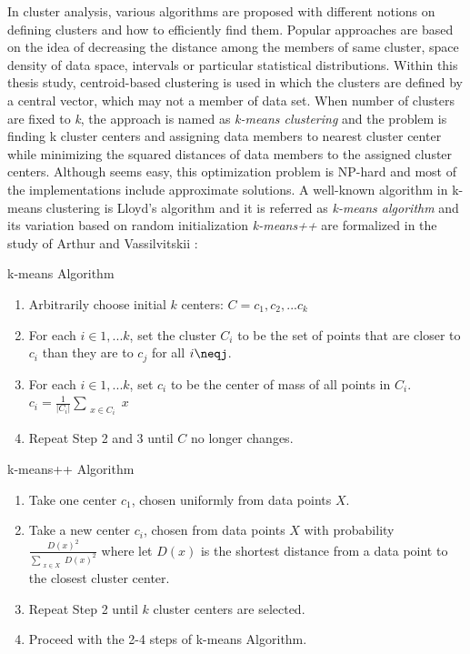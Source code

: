 In cluster analysis, various algorithms are proposed with different notions on defining clusters and how to efficiently find them. Popular approaches are based on the idea of decreasing the distance among the members of same cluster, space density of data space, intervals or particular statistical distributions. Within this thesis study, centroid-based clustering is used in which the clusters are defined by a central vector, which may not a member of data set. When number of clusters are fixed to \textit{k}, the approach is named as \textit{k-means clustering} and the problem is finding k cluster centers and assigning data members to nearest cluster center while minimizing the squared distances of data members to the assigned cluster centers. Although seems easy, this optimization problem is NP-hard and most of the implementations include approximate solutions. A well-known algorithm in k-means clustering is Lloyd's algorithm and it is referred as \textit{k-means algorithm} and its variation based on random initialization \textit{k-means++} are formalized in the study of Arthur and Vassilvitskii \cite{arthur2007}: 
\theoremstyle{definition}
\begin{definition}{k-means Algorithm}
\begin{enumerate}
  \item Arbitrarily choose initial $k$ centers: $C={c_1,c_2,...c_k}$
  \item For each $i \in {1,...k}$, set the cluster $C_i$ to be the set of points that are closer to $c_i$ than they are to $c_j$ for all $i\neqj$.
  \item For each $i \in {1,...k}$, set $c_i$ to be the center of mass of all points in $C_i$. $c_i=\frac{1}{|C_i|} \sum_{\substack{x\in C_i}} x$
  \item Repeat Step 2 and 3 until $C$ no longer changes.
\end{enumerate}
\end{definition}
\theoremstyle{definition}
\begin{definition}{k-means++ Algorithm}
\begin{enumerate}
  \item Take one center $c_1$, chosen uniformly from data points $X$.
  \item Take a new center $c_i$, chosen from data points $X$ with probability $\frac{D(x)^2}{\sum_{\substack{x\in X}} D(x)^2}$ where let $D(x)$ is the shortest distance from a data point to the closest cluster center.
  \item Repeat Step 2 until $k$ cluster centers are selected.
  \item Proceed with the 2-4 steps of k-means Algorithm.
\end{enumerate}
\end{definition}

